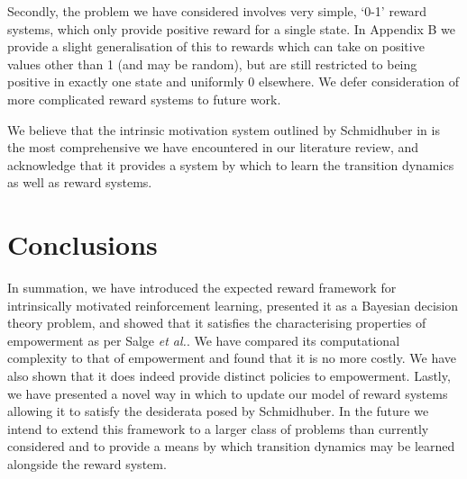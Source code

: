 \documentclass{article}
\begin{document}
Secondly, the problem we have considered involves very simple, `0-1' reward systems, which only provide positive reward for a single state. In Appendix B we provide a slight generalisation of this to rewards which can take on positive values other than 1 (and may be random), but are still restricted to being positive in exactly one state and uniformly 0 elsewhere. We defer consideration of more complicated reward systems to future work. 

We believe that the intrinsic motivation system outlined by Schmidhuber in \cite{schmidhuber2010formal} is the most comprehensive we have encountered in our literature review, and acknowledge that it provides a system by which to learn the transition dynamics as well as reward systems.

\section{Conclusions}
In summation, we have introduced the expected reward framework for intrinsically motivated reinforcement learning, presented it as a Bayesian decision theory problem, and showed that it satisfies the characterising properties of empowerment as per Salge \textit{et al.}. We have compared its computational complexity to that of empowerment and found that it is no more costly. We have also shown that it does indeed provide distinct policies to empowerment. Lastly, we have presented a novel way in which to update our model of reward systems allowing it to satisfy the desiderata posed by Schmidhuber. In the future we intend to extend this framework to a larger class of problems than currently considered and to  provide a means by which transition dynamics may be learned alongside the reward system.
\newpage
\nocite{*}


\newpage
\end{document}
